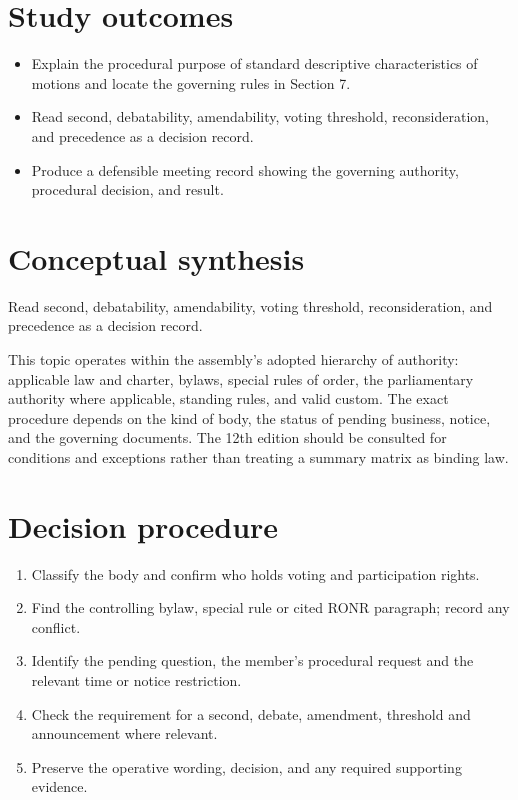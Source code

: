 \documentclass[11pt]{article}
\begin{document}
\SuiteOpen
{}
\section{Study outcomes}
\begin{itemize}[leftmargin=*,itemsep=4pt]
\item Explain the procedural purpose of standard descriptive characteristics of motions and locate the governing rules in Section 7.
\item Read second, debatability, amendability, voting threshold, reconsideration, and precedence as a decision record.
\item Produce a defensible meeting record showing the governing authority, procedural decision, and result.
\end{itemize}

\section{Conceptual synthesis}
Read second, debatability, amendability, voting threshold, reconsideration, and precedence as a decision record.

This topic operates within the assembly’s adopted hierarchy of authority: applicable law and charter, bylaws, special rules of order, the parliamentary authority where applicable, standing rules, and valid custom. The exact procedure depends on the kind of body, the status of pending business, notice, and the governing documents. The 12th edition should be consulted for conditions and exceptions rather than treating a summary matrix as binding law.
\section{Decision procedure}
\begin{enumerate}[leftmargin=*,itemsep=4pt]
\item Classify the body and confirm who holds voting and participation rights.
\item Find the controlling bylaw, special rule or cited RONR paragraph; record any conflict.
\item Identify the pending question, the member’s procedural request and the relevant time or notice restriction.
\item Check the requirement for a second, debate, amendment, threshold and announcement where relevant.
\item Preserve the operative wording, decision, and any required supporting evidence.
\end{enumerate}
\end{document}
